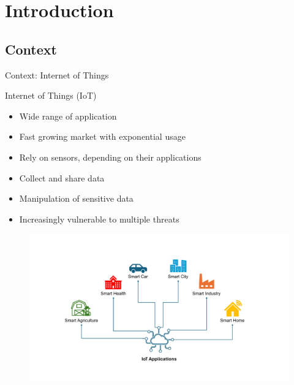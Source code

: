 \section*{Introduction}

\subsection{Context}
\begin{frame}{Context: Internet of Things}
    \begin{minipage}[c]{0.5\textwidth}
        \begin{block}{Internet of Things (IoT)}
            \begin{itemize}
                [square]
                \justifying
                \item Wide range of application
                \item Fast growing market with exponential usage
                \item Rely on sensors, depending on their applications
                \item Collect and share data
                \item Manipulation of sensitive data
                \item Increasingly vulnerable to multiple threats
            \end{itemize}
        \end{block}
    \end{minipage}\hfill%
    \begin{minipage}[c]{0.5\textwidth}
        \begin{figure}
            \centering
            \includegraphics[width=.78\textwidth, trim={4.5cm 2.25cm 5.75cm 3.25cm}, clip]{src/1_introduction/img/iotapplications.pdf}
            \label{fig:iot_application}

\end{figure}
\end{minipage}
\end{frame}
